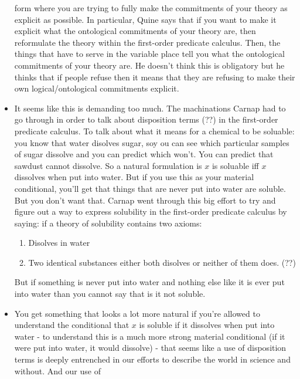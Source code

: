 \documentclass[12pt]{article}
\theoremstyle{definition}
\begin{document}
\begin{itemize}
        form where you are trying to fully make the commitments of your theory
        as explicit as possible. In particular, Quine says that if you want to
        make it explicit what the ontological commitments of your theory are,
        then reformulate the theory within the first-order predicate calculus.
        Then, the things that have to serve in the variable place tell you what
        the ontological commitments of your theory are. He doesn't think this
        is obligatory but he thinks that if people refuse then it means that
        they are refusing to make their own logical/ontological commitments
        explicit.
    \item
        It seems like this is demanding too much. The machinations Carnap had
        to go through in order to talk about disposition terms (??) in the
        first-order predicate calculus. To talk about what it means for a
        chemical to be soluable: you know that water disolves sugar, soy ou can
        see which particular samples of sugar dissolve and you can predict
        which won't. You can predict that sawdust cannot dissolve. So a natural
        formulation is $x$ is soluable iff $x$ dissolves when put into water.
        But if you use this as your material conditional, you'll get that
        things that are never put into water are soluble. But you don't want
        that. Carnap went through this big effort to try and figure out a way
        to express solubility in the first-order predicate calculus by saying:
        if a theory of solubility contains two axioms:
        \begin{enumerate}
            \item Disolves in water
            \item Two identical substances either both disolves or neither of
                them does. (??)
        \end{enumerate}
        But if something is never put into water and nothing else like it is
        ever put into water than you cannot say that is it not soluble.
    \item
        You get something that looks a lot more natural if you're allowed to
        understand the conditional that $x$ is soluble if it dissolves when put
        into water - to understand this is a much more strong material
        conditional (if it were put into water, it would dissolve) - that seems
        like a use of disposition terms is deeply entrenched in our efforts to
        describe the world in science and without. And our use of

\end{itemize}
\end{document}
